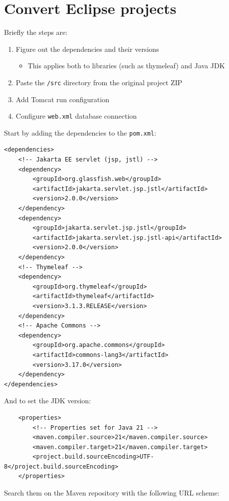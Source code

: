 
\section{Convert Eclipse projects}

Briefly the steps are:
\begin{enumerate}
  \item Figure out the dependencies and their versions
    \begin{itemize}
      \item This applies both to libraries (such as thymeleaf) and Java JDK
    \end{itemize}
  \item Paste the \texttt{/src} directory from the original project ZIP
  \item Add Tomcat run configuration
  \item Configure \texttt{web.xml} database connection
\end{enumerate}

Start by adding the dependencies to the \texttt{pom.xml}:
\begin{verbatim}
<dependencies>
    <!-- Jakarta EE servlet (jsp, jstl) -->
    <dependency>
        <groupId>org.glassfish.web</groupId>
        <artifactId>jakarta.servlet.jsp.jstl</artifactId>
        <version>2.0.0</version>
    </dependency>
    <dependency>
        <groupId>jakarta.servlet.jsp.jstl</groupId>
        <artifactId>jakarta.servlet.jsp.jstl-api</artifactId>
        <version>2.0.0</version>
    </dependency>
    <!-- Thymeleaf -->
    <dependency>
        <groupId>org.thymeleaf</groupId>
        <artifactId>thymeleaf</artifactId>
        <version>3.1.3.RELEASE</version>
    </dependency>
    <!-- Apache Commons -->
    <dependency>
        <groupId>org.apache.commons</groupId>
        <artifactId>commons-lang3</artifactId>
        <version>3.17.0</version>
    </dependency>
</dependencies>
\end{verbatim}

And to set the JDK version:
\begin{verbatim}
    <properties>
        <!-- Properties set for Java 21 -->
        <maven.compiler.source>21</maven.compiler.source>
        <maven.compiler.target>21</maven.compiler.target>
        <project.build.sourceEncoding>UTF-8</project.build.sourceEncoding>
    </properties>
\end{verbatim}

Search them on the Maven repository with the following URL scheme:

